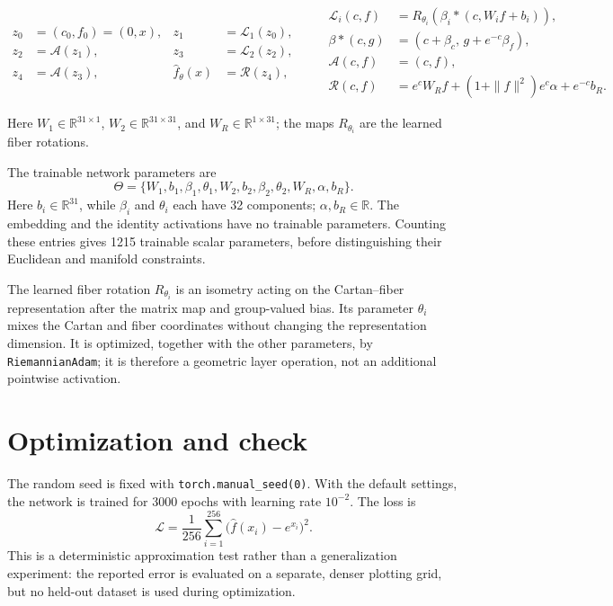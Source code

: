 \documentclass[10pt]{article}
\begin{document}
\begin{equation}
\begin{aligned}
 z_0&=(c_0,f_0)=(0,x),
 &z_1&=\mathcal L_1(z_0),\\
 z_2&=\mathcal A(z_1),
 &z_3&=\mathcal L_2(z_2),\\
 z_4&=\mathcal A(z_3),
 &\widehat f_\theta(x)&=\mathcal R(z_4),
 \end{aligned}
\qquad
\begin{aligned}
 \mathcal L_i(c,f)&=R_{\theta_i}\!\left(\beta_i*(c,W_i f+b_i)\right),\\
 \beta*(c,g)&=(c+\beta_c,\,g+e^{-c}\beta_f),\\
 \mathcal A(c,f)&=(c,f),\\
 \mathcal R(c,f)&=e^c W_Rf+(1+\|f\|^2)e^c\alpha+e^{-c}b_R.
 \end{aligned}
\end{equation}

Here \(W_1\in\mathbb R^{31\times1}\), \(W_2\in\mathbb
R^{31\times31}\), and \(W_R\in\mathbb R^{1\times31}\); the maps
\(R_{\theta_i}\) are the learned fiber rotations.

The trainable network parameters are
\begin{equation}
 \Theta=\{W_1,b_1,\beta_1,\theta_1,
          W_2,b_2,\beta_2,\theta_2,
          W_R,\alpha,b_R\}.
\end{equation}
Here \(b_i\in\mathbb R^{31}\), while \(\beta_i\) and \(\theta_i\) each have
32 components; \(\alpha,b_R\in\mathbb R\).  The embedding and the identity
activations have no trainable parameters.  Counting these entries gives 1215
trainable scalar parameters, before distinguishing their Euclidean and
manifold constraints.

The learned fiber rotation \(R_{\theta_i}\) is an isometry acting on the
Cartan--fiber representation after the matrix map and group-valued bias.  Its
parameter \(\theta_i\) mixes the Cartan and fiber coordinates without changing
the representation dimension.  It is optimized, together with the other
parameters, by \texttt{RiemannianAdam}; it is therefore a geometric layer
operation, not an additional pointwise activation.

\section{Optimization and check}

The random seed is fixed with \texttt{torch.manual\_seed(0)}.  With the
default settings, the network is trained for 3000 epochs with learning rate
\(10^{-2}\).  The loss is
\begin{equation}
 \mathcal L=\frac{1}{256}\sum_{i=1}^{256}
 \bigl(\widehat f(x_i)-e^{x_i}\bigr)^2.
\end{equation}
This is a deterministic approximation test rather than a generalization
experiment: the reported error is evaluated on a separate, denser plotting
grid, but no held-out dataset is used during optimization.
\end{document}
